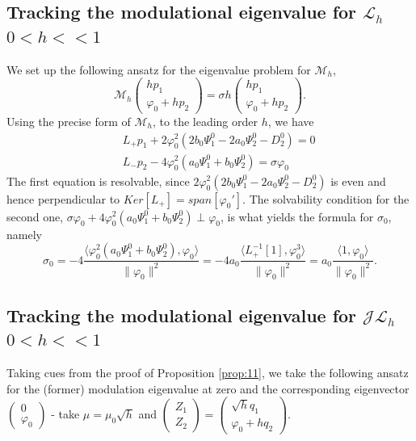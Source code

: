 \documentclass[12pt]{amsart}
\theoremstyle{definition}
\theoremstyle{remark}
\numberwithin{equation}{section}
\renewcommand{\(}{\left(}
\renewcommand{\)}{\right)}
\renewcommand{\[}{\left[}
\renewcommand{\]}{\right]}
\newcommand{\f}[2]{\frac{#1}{#2}}
\newcommand{\cl}{{\mathcal L}}
\newcommand{\si}{\sigma}
\newcommand{\vp}{\varphi}
\newcommand{\dpr}[2]{\langle #1,#2 \rangle}
\newcommand{\cm}{\mathcal M}
\newcommand{\cj}{{\mathcal J}}
\begin{document}
    \subsection{Tracking the modulational  eigenvalue for  $\cl_h$ $0<h<<1$}
  We set up the following ansatz for the eigenvalue problem for $\cm_h$,
  \begin{equation}
  \label{b:70}
  \cm_h  \left(\begin{array}{c}
   h p_1  \\ \vp_0 + h p_2
  \end{array}\right)=\si h  \left(\begin{array}{c}
   h p_1  \\ \vp_0+ h p_2
  \end{array}\right).
  \end{equation}
    Using the precise form of $\cm_h$, to the leading order $h$, we have
    \begin{eqnarray*}
& & L_+ p_1 + 2 \vp_0^2 (2 b_0 \Psi_1^0-2 a_0 \Psi_2^0-D_2^0)=0 \\
& & L_- p_2 -4\vp_0^2(a_0\Psi_1^0+b_0 \Psi_2^0)=\si \vp_0
    \end{eqnarray*}
    The first equation is resolvable, since $ 2 \vp_0^2 (2 b_0 \Psi_1^0-2 a_0 \Psi_2^0-D_2^0)$ is even and hence perpendicular to $Ker[L_+]=span[\vp_0']$. The solvability condition for the second one, $\si \vp_0 + 4\vp_0^2(a_0\Psi_1^0+b_0 \Psi_2^0)\perp \vp_0$,  is what yields the formula for $\si_0$, namely
    \begin{equation}
    \label{b:90}
    \si_0=-4\f{\dpr{\vp_0^2(a_0\Psi_1^0+b_0 \Psi_2^0)}{\vp_0}}{\|\vp_0\|^2}= -4 a_0\f{\dpr{L_+^{-1}[1]}{\vp_0^3}}{\|\vp_0\|^2}=a_0\f{\dpr{1}{\vp_0}}{\|\vp_0\|^2}.
    \end{equation}






\subsection{Tracking the modulational eigenvalue for $\cj \cl_h$ $0<h<<1$}



Taking cues from the proof of Proposition \ref{prop:11}, we take the following ansatz for the (former) modulation eigenvalue at zero and the corresponding eigenvector $\left(\begin{array}{c}
0 \\ \vp_0 \end{array}\right)$ - take $\mu=\mu_0 \sqrt{h}$ and
$\left(\begin{array}{c}
Z_1 \\ Z_2
\end{array}\right)=\left(\begin{array}{c}
\sqrt{h} q_1  \\ \vp_0+h q_2
\end{array}\right)$.
\end{document}
